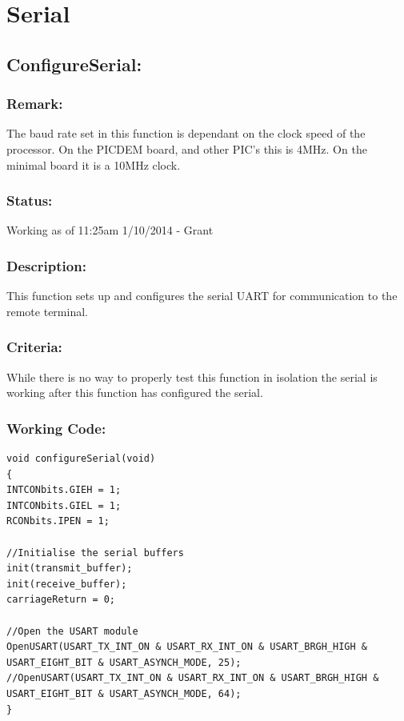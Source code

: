 \documentclass[]{report}
\begin{document}
\newpage
\section{Serial}


\subsection{ConfigureSerial:}
\subsubsection{Remark:}
The baud rate set in this function is dependant on the clock speed of the processor. On the PICDEM board, and other PIC's this is 4MHz. On the minimal board it is a 10MHz clock.

\subsubsection{Status:}
Working as of 11:25am 1/10/2014 - Grant

\subsubsection{Description:}
This function sets up and configures the serial UART for communication to the remote terminal.

\subsubsection{Criteria:}
While there is no way to properly test this function in isolation the serial is working after this function has configured the serial.

\subsubsection{Working Code:}
\begin{lstlisting}
void configureSerial(void)
{
INTCONbits.GIEH = 1;
INTCONbits.GIEL = 1;
RCONbits.IPEN = 1;

//Initialise the serial buffers
init(transmit_buffer);
init(receive_buffer);
carriageReturn = 0;

//Open the USART module
OpenUSART(USART_TX_INT_ON & USART_RX_INT_ON & USART_BRGH_HIGH & USART_EIGHT_BIT & USART_ASYNCH_MODE, 25);
//OpenUSART(USART_TX_INT_ON & USART_RX_INT_ON & USART_BRGH_HIGH & USART_EIGHT_BIT & USART_ASYNCH_MODE, 64);
}
\end{lstlisting}
\end{document}
